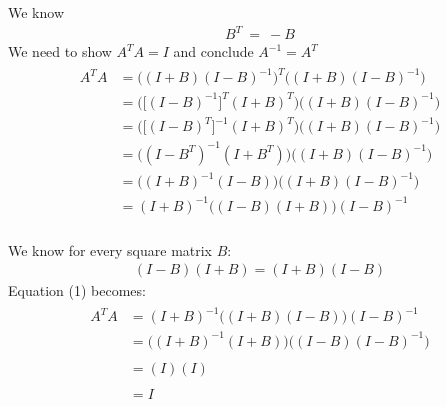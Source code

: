 \documentclass[a4paper,11pt]{article}
\begin{document}
\begin{margin}{0.5cm}{0.5cm}
We know
\begin{align*}
B^{T}\ =\ -B
\end{align*}
We need to show $A^{T}A=I$ and conclude $A^{-1}=A^{T}$ \\
\begin{align}
\begin{split}
A^{T}A
&=\bigg((I+B)(I-B)^{-1}\bigg)^{T}\bigg((I+B)(I-B)^{-1}\bigg)\\
&=\bigg(\bigg[(I-B)^{-1}\bigg]^{T}(I+B)^{T}\bigg)\bigg((I+B)(I-B)^{-1}\bigg)\\
&=\bigg(\bigg[(I-B)^{T}\bigg]^{-1}(I+B)^{T}\bigg)\bigg((I+B)(I-B)^{-1}\bigg) \\
&=\bigg((I-B^{T})^{-1}(I+B^{T})\bigg)\bigg((I+B)(I-B)^{-1}\bigg) \\
&=\bigg((I+B)^{-1}(I-B)\bigg)\bigg((I+B)(I-B)^{-1}\bigg) \\
&=(I+B)^{-1}\bigg((I-B)(I+B)\bigg)(I-B)^{-1}
\end{split}
\end{align}
\\
We know for every square matrix $B$:
\begin{align}
(I-B)(I+B) = (I+B)(I-B)
\end{align}
Equation (1) becomes:
\begin{align}
\begin{split}
A^{T}A
&=(I+B)^{-1}\bigg((I+B)(I-B)\bigg)(I-B)^{-1} \\
&=\bigg((I+B)^{-1}(I+B)\bigg)\bigg((I-B)(I-B)^{-1}\bigg) \\\\
&= (I)(I) \\\\
&= I
\end{split}
\end{align}
\end{margin}

\newpage
\end{document}
